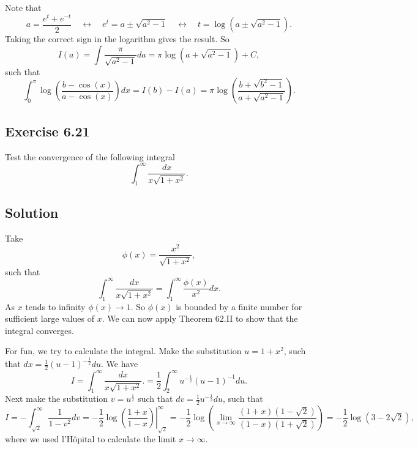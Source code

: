 Note that
\begin{equation*}
    a = \frac{e^t + e^{-t}}{2}
        \quad \leftrightarrow \quad e^t = a \pm \sqrt{a^2 - 1}
        \quad \leftrightarrow \quad t = \log(a \pm \sqrt{a^2 - 1}).
\end{equation*}
Taking the correct sign in the logarithm gives the result.
So
\begin{equation*}
    I(a) = \int \frac{\pi}{\sqrt{a^2 - 1}} da = \pi \log\left(a + \sqrt{a^2 - 1}\right) + C,
\end{equation*}
such that
\begin{equation*}
    \int_0^\pi \log\left(\frac{b - \cos(x)}{a - \cos(x)} \right) dx
        = I(b) - I(a)
        = \pi \log\left( \frac{b + \sqrt{b^2 - 1}}{a + \sqrt{a^2 - 1}} \right).
\end{equation*}


\subsection*{Exercise 6.21}

Test the convergence of the following integral
\begin{equation*}
    \int_1^{\infty} \frac{dx}{x\sqrt{1 + x^2}}.
\end{equation*}

\subsection*{Solution}

Take
\begin{equation*}
    \phi(x) = \frac{x^2}{\sqrt{1 + x^2}},
\end{equation*}
such that
\begin{equation*}
    \int_1^{\infty} \frac{dx}{x\sqrt{1 + x^2}} = \int_1^{\infty} \frac{\phi(x)}{x^2} dx.
\end{equation*}
As $x$ tends to infinity $\phi(x) \to 1$.
So $\phi(x)$ is bounded by a finite number for sufficient large values of $x$.
We can now apply Theorem 62.II to show that the integral converges.

For fun, we try to calculate the integral.
Make the substitution $u = 1 + x^2$, such that $dx = \frac{1}{2}(u - 1)^{-\frac{1}{2}}du$.
We have
\begin{equation*}
    I = \int_1^{\infty} \frac{dx}{x\sqrt{1 + x^2}}.
        = \frac{1}{2} \int_2^{\infty} u^{-\frac{1}{2}} (u - 1)^{-1} du.
\end{equation*}
Next make the substitution $v = u^{\frac{1}{2}}$ such that $dv = \frac{1}{2} u^{-\frac{1}{2}} du$, such that
\begin{equation*}
    I = -\int_{\sqrt{2}}^{\infty} \frac{1}{1 - v^2} dv
        = - \frac{1}{2} \left.\log\left(\frac{1 + x}{1 - x}\right)\right|_{\sqrt{2}}^{\infty}
        = - \frac{1}{2} \log \left( \lim_{x \to \infty} \frac{(1 + x)(1 - \sqrt{2})}{(1 - x)(1 + \sqrt{2})} \right)
        = - \frac{1}{2} \log \left( 3 - 2\sqrt{2} \right),
\end{equation*}
where we used l'H\^opital to calculate the limit $x \to \infty$.


